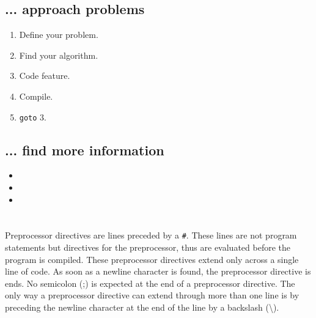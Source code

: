 \documentclass[10pt,a4paper]{scrartcl}
\begin{document}
\begin{multicols*}{2}
\subsection{... approach problems}

\begin{enumerate}
\item Define your problem.
\item Find your algorithm.
\item Code feature.
\item Compile.
\item \verb+goto+ 3.
\end{enumerate}

\subsection{... find more information}

\begin{itemize}
\item {}
\item {}
\item {}
\end{itemize}
\fi

\glsaddall

\printnoidxglossary[sort=def,title={Terms},nonumberlist=true,nopostdot=true]

\section{}

\subsection{}

Preprocessor directives are lines preceded by a \verb+#+. These lines are not program statements but directives for the preprocessor, thus are evaluated before the program is compiled.
These preprocessor directives extend only across a single line of code. As soon as a newline character is found, the preprocessor directive is ends. No semicolon (;) is expected at the end of a preprocessor directive. The only way a preprocessor directive can extend through more than one line is by preceding the newline character at the end of the line by a backslash (\textbackslash).


\end{multicols*}
\end{document}
